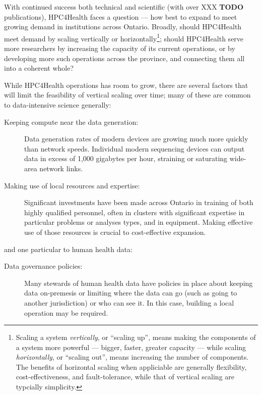 \documentclass[twoside,symmetric,sfsidenotes,notoc]{tufte-book}
\begin{document}
With continued success both technical and scientific (with over XXX \textbf{TODO}
publications), HPC4Health faces a question --- how best to expand to meet growing demand
in institutions across Ontario.  Broadly, should HPC4Health meet demand by scaling
vertically or horizontally\footnote{Scaling a system \textit{vertically}, or ``scaling up'',
means making the components of a system more powerful --- bigger, faster,  greater capacity ---
while scaling \textit{horizontally}, or ``scaling out'', means increasing the number of
components.  The benefits of horizontal scaling when appliciable are generally flexibility,
cost-effectiveness, and fault-tolerance, while that of vertical scaling are typcially 
simplicity.}; should HPC4Health serve more researchers by increasing the capacity of
its current operations, or by developing more such operations across the province, and
connecting them all into a coherent whole?

While HPC4Health operations has room to grow, there are several factors that will limit
the feasibility of vertical scaling over time; many of these are common to data-intensive
science generally:

\begin{description}
  \item[Keeping compute near the data generation:]{Data generation rates of modern devices
  are growing much more quickly than network speeds. Individual modern sequencing devices
  can output data in excess of 1,000 gigabytes per hour, straining or saturating wide-area
  network links. }
  \item[Making use of local resources and expertise:]{Significant investments have been
  made across Ontario in training of both highly qualified personnel, often in clusters with 
  significant expertise in particular problems or analyses types, and in equipment.  Making
  effective use of those resources is crucial to cost-effective expansion. }
\end{description}

\noindent and one particular to human health data:

\begin{description}
  \item[Data governance policies:]{Many stewards of human health data have policies in place
  about keeping data on-premesis or limiting where the data can go (such as going to another
  jurisdiction) or who can see it.  In this case, building a local operation may be required. }
\end{description}
\end{document}
